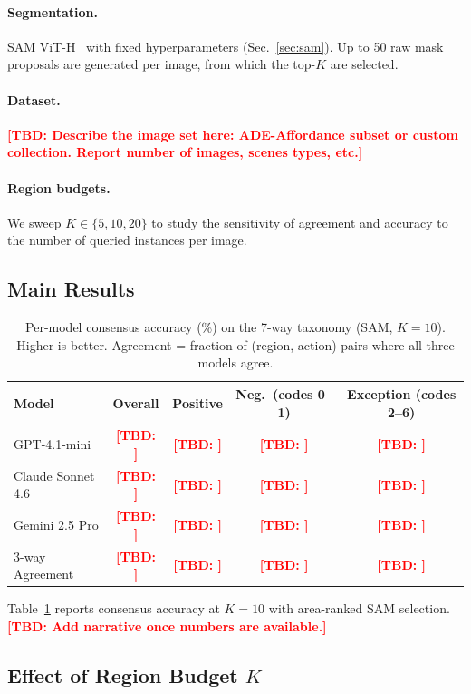 \documentclass[runningheads]{llncs}
\newcommand{\TBD}[1]{\textcolor{red}{\textbf{[TBD: #1]}}}
\begin{document}
\paragraph{Segmentation.}
SAM ViT-H~\cite{kirillov2023sam} with fixed hyperparameters
(Sec.~\ref{sec:sam}). Up to 50 raw mask proposals are generated per
image, from which the top-$K$ are selected.

\paragraph{Dataset.}
\TBD{Describe the image set here: ADE-Affordance subset or custom
collection. Report number of images, scenes types, etc.}

\paragraph{Region budgets.}
We sweep $K \in \{5, 10, 20\}$ to study the sensitivity of agreement and
accuracy to the number of queried instances per image.

\subsection{Main Results}
\label{sec:main_results}

\begin{table}[t]
  \centering
  \caption{Per-model consensus accuracy (\%) on the 7-way taxonomy
    (SAM, $K=10$). Higher is better. Agreement = fraction of
    (region, action) pairs where all three models agree.}
  \label{tab:main}
  \begin{tabular}{lcccc}
    \toprule
    Model & Overall & Positive & Neg.\ (codes 0--1) & Exception (codes 2--6) \\
    \midrule
    GPT-4.1-mini     & \TBD{} & \TBD{} & \TBD{} & \TBD{} \\
    Claude Sonnet 4.6 & \TBD{} & \TBD{} & \TBD{} & \TBD{} \\
    Gemini 2.5 Pro    & \TBD{} & \TBD{} & \TBD{} & \TBD{} \\
    \midrule
    3-way Agreement   & \TBD{} & \TBD{} & \TBD{} & \TBD{} \\
    \bottomrule
  \end{tabular}
\end{table}

Table~\ref{tab:main} reports consensus accuracy at $K=10$ with area-ranked
SAM selection. \TBD{Add narrative once numbers are available.}

\subsection{Effect of Region Budget $K$}
\label{sec:k_ablation}
\end{document}
